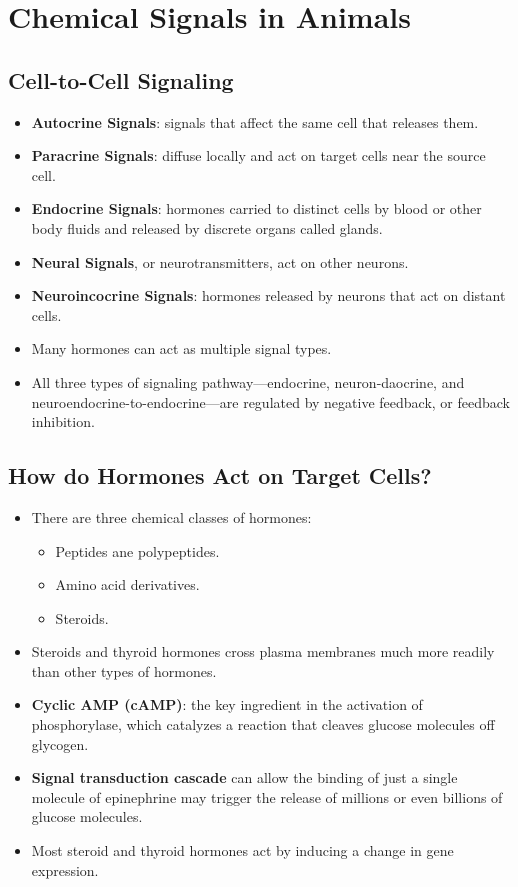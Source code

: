 \documentclass[12pt,a4paper]{article}
\begin{document}
\section{Chemical Signals in Animals}
\subsection{Cell-to-Cell Signaling}
\begin{itemize}
    \item \textbf{Autocrine Signals}: signals that affect the same cell that releases them.
    \item \textbf{Paracrine Signals}: diffuse locally and act on target cells near the source cell.
    \item \textbf{Endocrine Signals}: hormones carried to distinct cells by blood or other body fluids and released by discrete organs called glands.
    \item \textbf{Neural Signals}, or neurotransmitters, act on other neurons.
    \item \textbf{Neuroincocrine Signals}: hormones released by neurons that act on distant cells.
    \item Many hormones can act as multiple signal types.
    \item All three types of signaling pathway—endocrine, neuron-daocrine, and neuroendocrine-to-endocrine—are regulated by
    negative feedback, or feedback inhibition.
\end{itemize}
\subsection{How do Hormones Act on Target Cells?}

\begin{itemize}
    \item There are three chemical classes of hormones:
        \begin{itemize}
            \item Peptides ane polypeptides.
            \item Amino acid derivatives.
            \item Steroids.
        \end{itemize}
    \item Steroids and thyroid hormones cross plasma membranes much more readily than other types of hormones.
    \item \textbf{Cyclic AMP (cAMP)}: the key ingredient in the activation of phosphorylase, which catalyzes a reaction that cleaves glucose molecules off glycogen.
    \item \textbf{Signal transduction cascade} can allow the binding of just a single molecule of epinephrine may trigger the release of millions or even billions of glucose molecules.
    \item Most steroid and thyroid hormones act by inducing a change in
    gene expression.    
\end{itemize}
\end{document}
